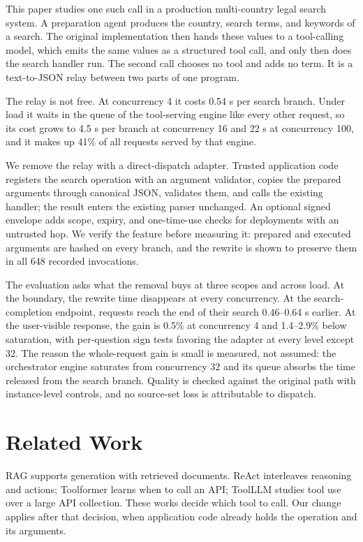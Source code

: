 \documentclass[paper]{ieice}
\begin{document}
This paper studies one such call in a production multi-country legal search system. A preparation agent produces the country, search terms, and keywords of a search. The original implementation then hands these values to a tool-calling model, which emits the same values as a structured tool call, and only then does the search handler run. The second call chooses no tool and adds no term. It is a text-to-JSON relay between two parts of one program.

The relay is not free. At concurrency 4 it costs 0.54 s per search branch. Under load it waits in the queue of the tool-serving engine like every other request, so its cost grows to 4.5 s per branch at concurrency 16 and 22 s at concurrency 100, and it makes up 41\% of all requests served by that engine.

We remove the relay with a direct-dispatch adapter. Trusted application code registers the search operation with an argument validator, copies the prepared arguments through canonical JSON, validates them, and calls the existing handler; the result enters the existing parser unchanged. An optional signed envelope adds scope, expiry, and one-time-use checks for deployments with an untrusted hop. We verify the feature before measuring it: prepared and executed arguments are hashed on every branch, and the rewrite is shown to preserve them in all 648 recorded invocations.

The evaluation asks what the removal buys at three scopes and across load. At the boundary, the rewrite time disappears at every concurrency. At the search-completion endpoint, requests reach the end of their search 0.46--0.64 s earlier. At the user-visible response, the gain is 0.5\% at concurrency 4 and 1.4--2.9\% below saturation, with per-question sign tests favoring the adapter at every level except 32. The reason the whole-request gain is small is measured, not assumed: the orchestrator engine saturates from concurrency 32 and its queue absorbs the time released from the search branch. Quality is checked against the original path with instance-level controls, and no source-set loss is attributable to dispatch.

\section{Related Work}
RAG supports generation with retrieved documents\cite{rag}. ReAct interleaves reasoning and actions\cite{react}; Toolformer learns when to call an API\cite{toolformer}; ToolLLM studies tool use over a large API collection\cite{toolllm}. These works decide which tool to call. Our change applies after that decision, when application code already holds the operation and its arguments.
\end{document}
